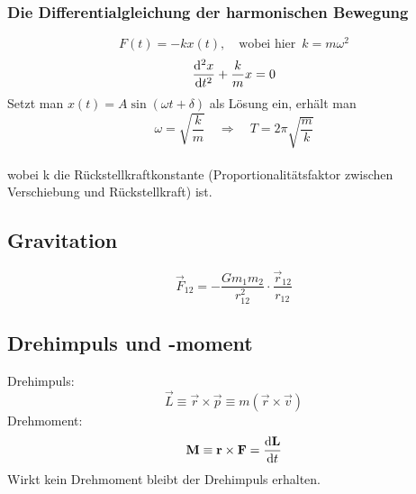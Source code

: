 \subsubsection{Die Differentialgleichung der harmonischen Bewegung}
\begin{equation}
F(t) = -kx(t), \quad \text{wobei hier} \enspace k = m \omega ^2
\end{equation}
\begin{equation}
\frac{\mathrm d^2 x}{\mathrm d t^2} + \dfrac{k}{m}x = 0
\end{equation}
Setzt man $x(t) = A \sin \left( \omega t + \delta \right)$ als Lösung ein, erhält man
\begin{equation}
\omega = \sqrt{\dfrac{k}{m}} \quad\Rightarrow\quad T = 2\pi\sqrt{\dfrac{m}{k}}
\end{equation}\\
wobei k die Rückstellkraftkonstante (Proportionalitätsfaktor zwischen Verschiebung und Rückstellkraft) ist.
\subsection{Gravitation}
\begin{equation}
\vec{F}_{12} = -\dfrac{G m_1 m_2}{r_{12}^2} \cdot \dfrac{\vec{r}_{12}}{r_{12}}
\end{equation}
\subsection{Drehimpuls und -moment}
Drehimpuls: $$\vec{L} \equiv \vec{r} \times \vec{p} \equiv m \left( \vec{r} \times \vec{v} \right)$$ 
Drehmoment: $$\mathbf{M} \equiv \mathbf{r} \times \mathbf{F} = \frac{\mathrm d \mathbf{L}}{\mathrm d t}$$ 
Wirkt kein Drehmoment bleibt der Drehimpuls erhalten.